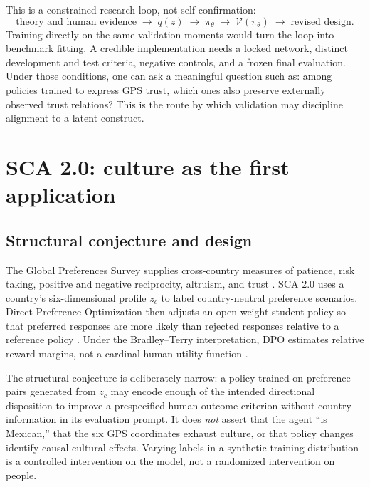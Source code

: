 \documentclass[10pt,letterpaper]{article}
\begin{document}
This is a constrained research loop, not self-confirmation:
\[
\text{theory and human evidence}\;\rightarrow\;q(z)\;\rightarrow\;\pi_\theta\;\rightarrow\;\mathcal{V}(\pi_\theta)\;\rightarrow\;\text{revised design}.
\]
Training directly on the same validation moments would turn the loop into benchmark fitting. A credible implementation needs a locked network, distinct development and test criteria, negative controls, and a frozen final evaluation. Under those conditions, one can ask a meaningful question such as: among policies trained to express GPS trust, which ones also preserve externally observed trust relations? This is the route by which validation may discipline alignment to a latent construct.

\section{SCA 2.0: culture as the first application}
\subsection{Structural conjecture and design}
The Global Preferences Survey supplies cross-country measures of patience, risk taking, positive and negative reciprocity, altruism, and trust \cite{falk2018}. SCA 2.0 uses a country's six-dimensional profile $z_c$ to label country-neutral preference scenarios. Direct Preference Optimization then adjusts an open-weight student policy so that preferred responses are more likely than rejected responses relative to a reference policy \cite{rafailov2023}. Under the Bradley--Terry interpretation, DPO estimates relative reward margins, not a cardinal human utility function \cite{bradley1952}.

The structural conjecture is deliberately narrow: a policy trained on preference pairs generated from $z_c$ may encode enough of the intended directional disposition to improve a prespecified human-outcome criterion without country information in its evaluation prompt. It does \emph{not} assert that the agent ``is Mexican,'' that the six GPS coordinates exhaust culture, or that policy changes identify causal cultural effects. Varying labels in a synthetic training distribution is a controlled intervention on the model, not a randomized intervention on people.
\end{document}
